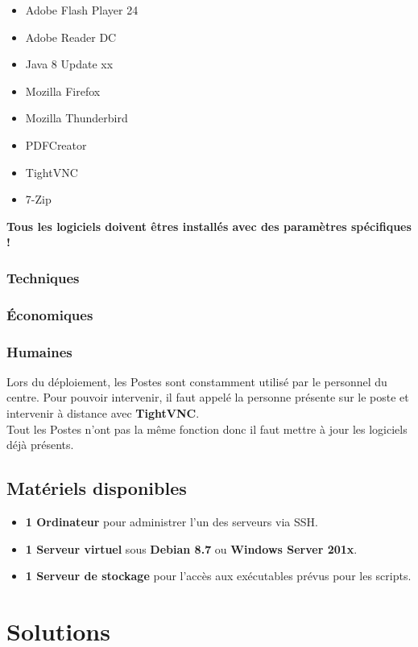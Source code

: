 \documentclass[11pt,a4paper,oneside]{article}
\begin{document}
\begin{itemize}
	\item Adobe Flash Player 24
	\item Adobe Reader DC
	\item Java 8 Update xx
	\item Mozilla Firefox
	\item Mozilla Thunderbird
	\item PDFCreator
	\item TightVNC
	\item 7-Zip
\end{itemize}

\begin{center}
\textbf{Tous les logiciels doivent êtres installés avec des paramètres spécifiques !}
\end{center}
\subsubsection{Techniques}
\subsubsection{Économiques}
\subsubsection{Humaines}
Lors du déploiement, les Postes sont constamment utilisé par le personnel du centre. Pour pouvoir intervenir, il faut appelé la personne présente sur le poste et intervenir à distance avec \textbf{TightVNC}.\\

Tout les Postes n'ont pas la même fonction donc il faut mettre à jour les logiciels déjà présents.

\subsection{Matériels disponibles}
\begin{itemize}
	\item \textbf{1 Ordinateur} pour administrer l'un des serveurs via SSH.
	\item \textbf{1 Serveur virtuel} sous \textbf{Debian 8.7} ou \textbf{Windows Server 201x}.
	\item \textbf{1 Serveur de stockage} pour l'accès aux exécutables prévus pour les scripts. 
\end{itemize}
\newpage

\section{Solutions}
\end{document}
